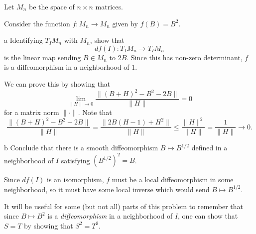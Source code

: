 \documentclass[11pt,letterpaper]{article}
\begin{document}
\begin{problem}
    Let $M_n$ be the space of $n\times n$ matrices.
\end{problem}
\begin{solution}
    \quad Consider the function $f : M_n \to M_n$ given by $f(B)=B^2$.
    \begin{partproblem}{a}
        Identifying $T_I M_n$ with $M_n$, show that
        \[
            df(I) : T_I M_n \to T_I M_n
        \]
        is the linear map sending $B\in M_n$ to $2B$. Since this has non-zero determinant, $f$ is a diffeomorphism in a neighborhood of $1$. 
    \end{partproblem}

    \quad We can prove this by showing that 
    \[
        \lim_{\|H\|\to 0}\frac{\|(B+H)^2-B^2-2B\|}{\|H\|} = 0
    \]
    for a matrix norm $\|\cdot\|$. Note that 
    \[
       \frac{\|(B+H)^2-B^2-2B\|}{\|H\|} = \frac{\|2B(H-1)+H^2\|}{\|H\|} \leq \frac{\|H\|^2}{\|H\|} = \frac{1}{\|H\|} \to 0
    .\] 

    \begin{partproblem}{b}
        Conclude that there is a smooth diffeomorphism $B\mapsto B^{1 /2}$ defined in a neighborhood of $I$ satisfying $(B^{1 /2})^2 = B$.
    \end{partproblem}
    \quad Since $df(I)$ is an isomorphism, $f$ must be a local diffeomorphism in some neighborhood, so it must have some local inverse which would send $B \mapsto B^{1 /2}$.
\end{solution}

\begin{problem}
    It will be useful for some (but not all) parts of this problem to remember that since $B \mapsto B^2$ is a \emph{diffeomorphism} in a neighborhood of $I$, one can show that $S=T$ by showing that $S^2=T^2$.
\end{problem}
\end{document}
